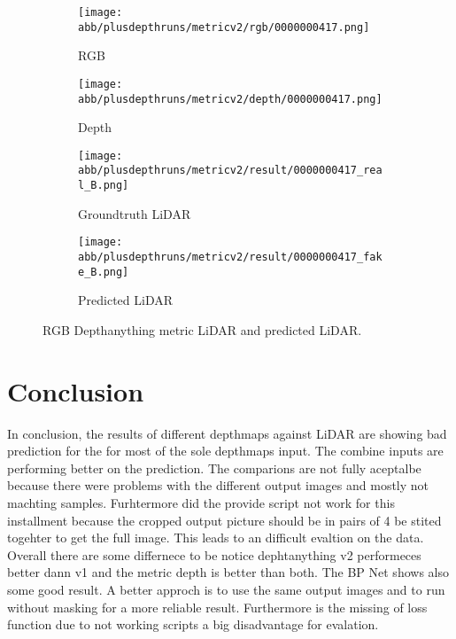 \begin{figure}[!ht]
	\centering
	
	\begin{subfigure}{0.4\textwidth}
		\centering
		\texttt{[image: abb/plusdepthruns/metricv2/rgb/0000000417.png]}
		\caption{RGB}
		\label{fig:bild1}
	\end{subfigure}
	
	\vspace{1em} %
	
	\begin{subfigure}{0.4\textwidth}
		\centering
		\texttt{[image: abb/plusdepthruns/metricv2/depth/0000000417.png]}
		\caption{Depth}
		\label{fig:bild2}
	\end{subfigure}
	
	\vspace{1em} %
	
	\begin{subfigure}{0.25\textwidth}
		\centering
		\texttt{[image: abb/plusdepthruns/metricv2/result/0000000417\_real\_B.png]}
		\caption{Groundtruth LiDAR}
		\label{fig:bild3}
	\end{subfigure}
	\begin{subfigure}{0.25\textwidth}
		\centering
		\texttt{[image: abb/plusdepthruns/metricv2/result/0000000417\_fake\_B.png]}
		\caption{Predicted LiDAR}
		\label{fig:bild4}
	\end{subfigure}
	
	\caption{RGB Depthanything metric LiDAR and predicted LiDAR.}
	\label{metric_rgbd}
\end{figure}
\chapter{Conclusion}
In conclusion, the results of different depthmaps against LiDAR are showing bad prediction for the for most of the sole depthmaps input. The combine inputs are performing better on the prediction. The comparions are not fully aceptalbe because there were problems with the different output images and mostly not machting samples. Furhtermore did the provide script not work for this installment because the cropped output picture should be in pairs of 4 be stited togehter to get the full image. This leads to an difficult evaltion on the data. \newline \\Overall there are some differnece to be notice dephtanything v2 performeces better dann v1 and the metric depth is better than both. The BP Net shows also some good result. A better approch is to use the same output images and to run without masking for  a more reliable result. Furthermore is the missing of loss function due to not working scripts a big disadvantage for evalation.

